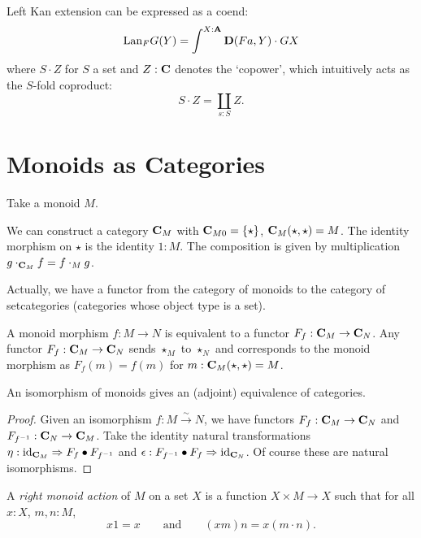 \begin{remark}
  Left Kan extension can be expressed as a coend:
  \[ \text{Lan}_{F}G(Y) = \int^{X : \mathbf{A}} \mathbf{D}(F a, Y) \cdot G X \]
  where $ S \cdot Z $ for $ S $ a set and $ Z : \mathbf{C} $ denotes the `copower', which intuitively acts as the $ S $-fold coproduct:
  \[ S \cdot Z = \coprod_{s : S} Z. \]
\end{remark}


\section{Monoids as Categories}\label{sec:monoid-category}
Take a monoid $ M $.
\begin{definition}
  We can construct a category $ \mathbf{C}_M $ with $ \mathbf{C}_{M0} = \{ \star \} $, $ \mathbf{C}_M(\star, \star) = M $. The identity morphism on $ \star $ is the identity $ 1: M $. The composition is given by multiplication $ g \cdot_{\mathbf{C}_M} f = f \cdot_M g $.
\end{definition}

\begin{remark}
  Actually, we have a functor from the category of monoids to the category of setcategories (categories whose object type is a set).

  A monoid morphism $ f: M \to N $ is equivalent to a functor $ F_f: \mathbf{C}_M \to \mathbf{C}_N $. Any functor $ F_f : \mathbf{C}_M \to \mathbf{C}_N $ sends $ \star_M $ to $ \star_N $ and corresponds to the monoid morphism as $ F_f(m) = f(m) $ for $ m: \mathbf{C}_M(\star, \star) = M $.
\end{remark}

\begin{lemma}
  An isomorphism of monoids gives an (adjoint) equivalence of categories.
\end{lemma}
\begin{proof}
  Given an isomorphism $ f: M \xrightarrow \sim N $, we have functors $ F_f: \mathbf{C}_M \to \mathbf{C}_N $ and $ F_{f^{-1}}: \mathbf{C}_N \to \mathbf{C}_M $. Take the identity natural transformations $ \eta: \text{id}_{\mathbf{C}_M} \Rightarrow F_f \bullet F_{f^{-1}} $ and $ \epsilon: F_{f^{-1}} \bullet F_f \Rightarrow \text{id}_{\mathbf{C}_N} $. Of course these are natural isomorphisms.
\end{proof}

\begin{definition}
  A \textit{right monoid action} of $ M $ on a set $ X $ is a function $ X \times M \to X $ such that for all $ x: X $, $ m, n: M $,
  \[ x 1 = x \qquad \text{and} \qquad (x m) n = x (m \cdot n). \]
\end{definition}

